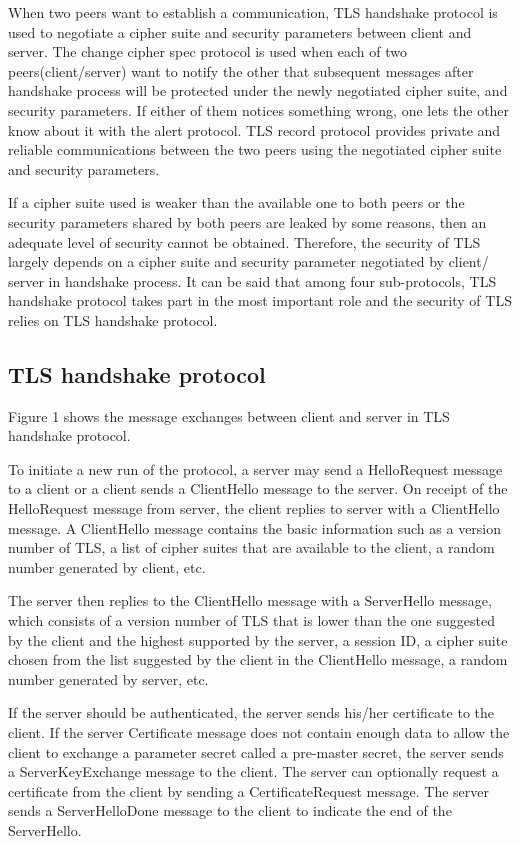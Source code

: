 \documentclass[a4paper,fleqn]{cas-dc}
\begin{document}
When two peers want to establish a communication, TLS handshake protocol is used to negotiate a cipher suite and security parameters between client and server. The change cipher spec protocol is used when each of two peers(client/server) want to notify the other that subsequent messages after handshake process will be protected under the newly negotiated cipher suite,  and security parameters. If either of them notices something wrong, one lets the other know about it with the alert protocol. TLS record protocol provides private and reliable communications between the two peers using the negotiated cipher suite and security parameters.

If a cipher suite used is weaker than the available one to both peers or the security parameters shared by both peers are leaked by some reasons, then an adequate level of security cannot be obtained. Therefore, the security of TLS largely depends on a cipher suite and security parameter negotiated by client/ server in handshake process. It can be said that among four sub-protocols, TLS handshake protocol takes part in the most important role and the security of TLS relies on TLS handshake protocol. 

\subsection{TLS handshake protocol}\label{handshake}
Figure 1 shows the message exchanges between client and server in TLS handshake protocol. 

To initiate a new run of the protocol, a server may send a HelloRequest message to a client or a client sends a ClientHello message to the server. On receipt of the HelloRequest message from server, the client replies to server with a ClientHello message. A ClientHello message contains the basic information such as a version number of TLS, a list of cipher suites that are available to the client, a random number generated by client, etc.

The server then replies to the ClientHello message with a
ServerHello message, which consists of a version number of TLS that is lower than the one suggested by the client and the highest supported by the server, a session ID, a cipher suite chosen from the list suggested by the client in the ClientHello message, a random number generated by server, etc. 

If the server should be authenticated, the server sends  his/her certificate to the client. If the server Certificate message does not contain enough data to allow the client to exchange a parameter secret called a pre-master secret, the server sends a ServerKeyExchange message to the client. The server can optionally request a certificate from the client by sending a CertificateRequest message. The server sends a ServerHelloDone message to the client to indicate the end of the ServerHello.
\end{document}
